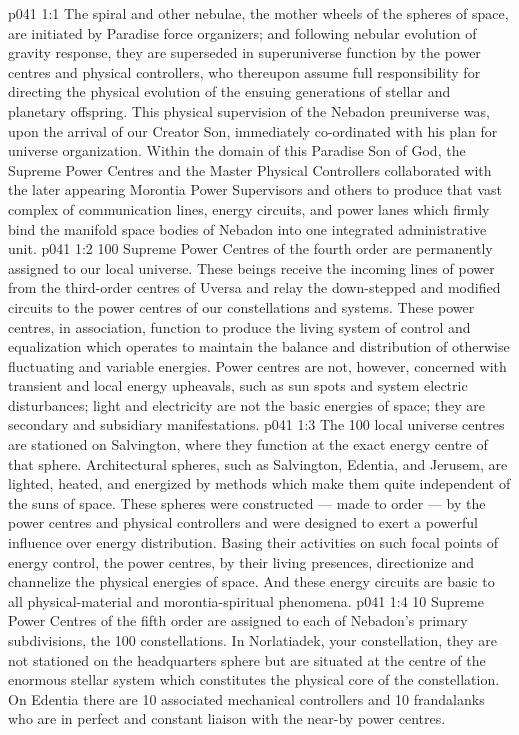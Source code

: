 \vs p041 1:1 The spiral and other nebulae, the mother wheels of the spheres of space, are initiated by Paradise force organizers; and following nebular evolution of gravity response, they are superseded in superuniverse function by the power centres and physical controllers, who thereupon assume full responsibility for directing the physical evolution of the ensuing generations of stellar and planetary offspring. This physical supervision of the Nebadon preuniverse was, upon the arrival of our Creator Son, immediately co\hyp{}ordinated with his plan for universe organization. Within the domain of this Paradise Son of God, the Supreme Power Centres and the Master Physical Controllers collaborated with the later appearing Morontia Power Supervisors and others to produce that vast complex of communication lines, energy circuits, and power lanes which firmly bind the manifold space bodies of Nebadon into one integrated administrative unit.
\vs p041 1:2 100 Supreme Power Centres of the fourth order are permanently assigned to our local universe. These beings receive the incoming lines of power from the third\hyp{}order centres of Uversa and relay the down\hyp{}stepped and modified circuits to the power centres of our constellations and systems. These power centres, in association, function to produce the living system of control and equalization which operates to maintain the balance and distribution of otherwise fluctuating and variable energies. Power centres are not, however, concerned with transient and local energy upheavals, such as sun spots and system electric disturbances; light and electricity are not the basic energies of space; they are secondary and subsidiary manifestations.
\vs p041 1:3 The 100 local universe centres are stationed on Salvington, where they function at the exact energy centre of that sphere. Architectural spheres, such as Salvington, Edentia, and Jerusem, are lighted, heated, and energized by methods which make them quite independent of the suns of space. These spheres were constructed --- made to order --- by the power centres and physical controllers and were designed to exert a powerful influence over energy distribution. Basing their activities on such focal points of energy control, the power centres, by their living presences, directionize and channelize the physical energies of space. And these energy circuits are basic to all physical\hyp{}material and morontia\hyp{}spiritual phenomena.
\vs p041 1:4 10 Supreme Power Centres of the fifth order are assigned to each of Nebadon’s primary subdivisions, the 100 constellations. In Norlatiadek, your constellation, they are not stationed on the headquarters sphere but are situated at the centre of the enormous stellar system which constitutes the physical core of the constellation. On Edentia there are 10 associated mechanical controllers and 10 frandalanks who are in perfect and constant liaison with the near\hyp{}by power centres.
